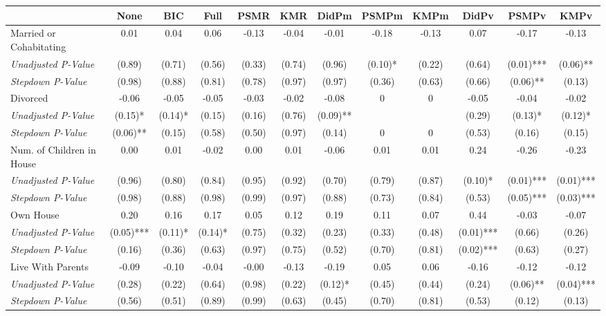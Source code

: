 \begin{tabular}{l c c c c c c c c c c c}
\toprule
 & None & BIC & Full & PSMR & KMR & DidPm & PSMPm & KMPm & DidPv & PSMPv & KMPv \\
\midrule
Married or Cohabitating & 0.01 & 0.04 & 0.06 & -0.13 & -0.04 & -0.01 & -0.18 & -0.13 & 0.07 & -0.17 & -0.13 \\
\quad \textit{Unadjusted P-Value} & (0.89) & (0.71) & (0.56) & (0.33) & (0.74) & (0.96) & (0.10)* & (0.22) & (0.64) & (0.01)*** & (0.06)** \\
\quad \textit{Stepdown P-Value} & (0.98) & (0.88) & (0.81) & (0.78) & (0.97) & (0.97) & (0.36) & (0.63) & (0.66) & (0.06)** & (0.13) \\
Divorced & -0.06 & -0.05 & -0.05 & -0.03 & -0.02 & -0.08 & 0 & 0 & -0.05 & -0.04 & -0.02 \\
\quad \textit{Unadjusted P-Value} & (0.15)* & (0.14)* & (0.15) & (0.16) & (0.76) & (0.09)** & & & (0.29) & (0.13)* & (0.12)* \\
\quad \textit{Stepdown P-Value} & (0.06)** & (0.15) & (0.58) & (0.50) & (0.97) & (0.14) & 0 & 0 & (0.53) & (0.16) & (0.15) \\
Num. of Children in House & 0.00 & 0.01 & -0.02 & 0.00 & 0.01 & -0.06 & 0.01 & 0.01 & 0.24 & -0.26 & -0.23 \\
\quad \textit{Unadjusted P-Value} & (0.96) & (0.80) & (0.84) & (0.95) & (0.92) & (0.70) & (0.79) & (0.87) & (0.10)* & (0.01)*** & (0.01)*** \\
\quad \textit{Stepdown P-Value} & (0.98) & (0.88) & (0.98) & (0.99) & (0.97) & (0.88) & (0.73) & (0.84) & (0.53) & (0.05)*** & (0.03)*** \\
Own House & 0.20 & 0.16 & 0.17 & 0.05 & 0.12 & 0.19 & 0.11 & 0.07 & 0.44 & -0.03 & -0.07 \\
\quad \textit{Unadjusted P-Value} & (0.05)*** & (0.11)* & (0.14)* & (0.75) & (0.32) & (0.23) & (0.33) & (0.48) & (0.01)*** & (0.66) & (0.26) \\
\quad \textit{Stepdown P-Value} & (0.16) & (0.36) & (0.63) & (0.97) & (0.75) & (0.52) & (0.70) & (0.81) & (0.02)*** & (0.63) & (0.27) \\
Live With Parents & -0.09 & -0.10 & -0.04 & -0.00 & -0.13 & -0.19 & 0.05 & 0.06 & -0.16 & -0.12 & -0.12 \\
\quad \textit{Unadjusted P-Value} & (0.28) & (0.22) & (0.64) & (0.98) & (0.22) & (0.12)* & (0.45) & (0.44) & (0.24) & (0.06)** & (0.04)*** \\
\quad \textit{Stepdown P-Value} & (0.56) & (0.51) & (0.89) & (0.99) & (0.63) & (0.45) & (0.70) & (0.81) & (0.53) & (0.12) & (0.13) \\
\bottomrule
\end{tabular}
